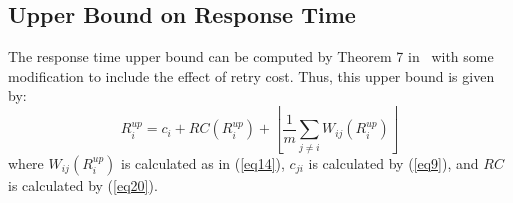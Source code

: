 \documentclass{sig-alternate}
\begin{document}
\subsection{Upper Bound on Response Time}

The response time upper bound can be computed by Theorem 7 in~\cite{key-2} with some modification to include the effect of retry cost. Thus, this upper bound is given by:
\begin{equation}
R_{i}^{up}=c_{i}+RC(R_{i}^{up})+\left\lfloor\frac{1}{m}\sum_{j\ne i}W_{ij}(R_{i}^{up})\right\rfloor\label{eq22}\end{equation}
where $W_{ij}(R_{i}^{up})$ is calculated as in (\ref{eq14}), $c_{ji}$ is calculated by (\ref{eq9}), and $RC$ is calculated by (\ref{eq20}).

\end{document}
